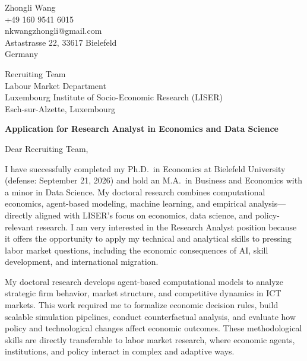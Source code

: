 \documentclass[11pt]{article}
\begin{document}
\begin{flushright}
Zhongli Wang \\
+49 160 9541 6015 \\
nkwangzhongli@gmail.com \\
Astastrasse 22, 33617 Bielefeld\\ Germany \\
\end{flushright}

\vspace{0.1cm}

\noindent
Recruiting Team \\
Labour Market Department \\
Luxembourg Institute of Socio-Economic Research (LISER) \\
Esch-sur-Alzette, Luxembourg \\

\vspace{0.1cm}

\noindent
\textbf{Application for Research Analyst in Economics and Data Science} \\

\vspace{0.05cm}

\noindent Dear Recruiting Team,

I have successfully completed my Ph.D.\ in Economics at Bielefeld University (defense: September 21, 2026) and hold an M.A.\ in Business and Economics with a minor in Data Science. My doctoral research combines computational economics, agent-based modeling, machine learning, and empirical analysis—directly aligned with LISER's focus on economics, data science, and policy-relevant research. I am very interested in the Research Analyst position because it offers the opportunity to apply my technical and analytical skills to pressing labor market questions, including the economic consequences of AI, skill development, and international migration.

My doctoral research develops agent-based computational models to analyze strategic firm behavior, market structure, and competitive dynamics in ICT markets. This work required me to formalize economic decision rules, build scalable simulation pipelines, conduct counterfactual analysis, and evaluate how policy and technological changes affect economic outcomes. These methodological skills are directly transferable to labor market research, where economic agents, institutions, and policy interact in complex and adaptive ways.
\end{document}
